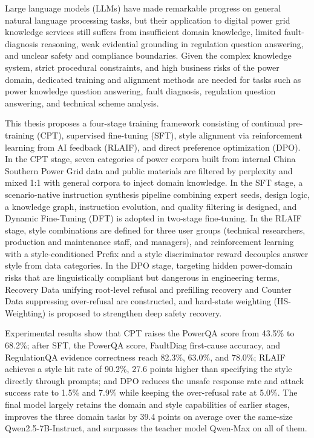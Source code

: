 \documentclass[fontset=fandol,type=master,campus=shenzhen,etitleauto=true]{hithesisbook}
\begin{document}
\begin{eabstract}
Large language models (LLMs) have made remarkable progress on general natural language processing tasks, but their application to digital power grid knowledge services still suffers from insufficient domain knowledge, limited fault-diagnosis reasoning, weak evidential grounding in regulation question answering, and unclear safety and compliance boundaries. Given the complex knowledge system, strict procedural constraints, and high business risks of the power domain, dedicated training and alignment methods are needed for tasks such as power knowledge question answering, fault diagnosis, regulation question answering, and technical scheme analysis.

This thesis proposes a four-stage training framework consisting of continual pre-training (CPT), supervised fine-tuning (SFT), style alignment via reinforcement learning from AI feedback (RLAIF), and direct preference optimization (DPO). In the CPT stage, seven categories of power corpora built from internal China Southern Power Grid data and public materials are filtered by perplexity and mixed 1:1 with general corpora to inject domain knowledge. In the SFT stage, a scenario-native instruction synthesis pipeline combining expert seeds, design logic, a knowledge graph, instruction evolution, and quality filtering is designed, and Dynamic Fine-Tuning (DFT) is adopted in two-stage fine-tuning. In the RLAIF stage, style combinations are defined for three user groups (technical researchers, production and maintenance staff, and managers), and reinforcement learning with a style-conditioned Prefix and a style discriminator reward decouples answer style from data categories. In the DPO stage, targeting hidden power-domain risks that are linguistically compliant but dangerous in engineering terms, Recovery Data unifying root-level refusal and prefilling recovery and Counter Data suppressing over-refusal are constructed, and hard-state weighting (HS-Weighting) is proposed to strengthen deep safety recovery.

Experimental results show that CPT raises the PowerQA score from 43.5\% to 68.2\%; after SFT, the PowerQA score, FaultDiag first-cause accuracy, and RegulationQA evidence correctness reach 82.3\%, 63.0\%, and 78.0\%; RLAIF achieves a style hit rate of 90.2\%, 27.6 points higher than specifying the style directly through prompts; and DPO reduces the unsafe response rate and attack success rate to 1.5\% and 7.9\% while keeping the over-refusal rate at 5.0\%. The final model largely retains the domain and style capabilities of earlier stages, improves the three domain tasks by 39.4 points on average over the same-size Qwen2.5-7B-Instruct, and surpasses the teacher model Qwen-Max on all of them.
\end{eabstract}
\end{document}
